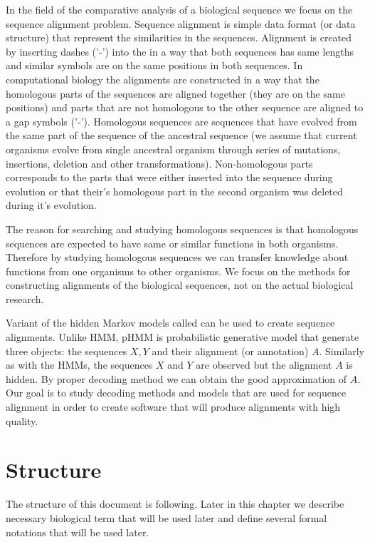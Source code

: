 In the field of the comparative analysis of a biological sequence we focus on the
sequence alignment problem. Sequence alignment is simple data format (or data
structure) that represent the similarities in the sequences. Alignment is
created by inserting dashes ('-') into the in a way that both sequences has same
lengths and similar symbols are on the same positions in both sequences. In
computational biology the alignments are constructed in a way that the
homologous parts of the sequences are aligned together (they are on the same
positions) and parts that are not homologous to the other sequence are aligned
to a gap symbols ('-'). Homologous sequences are sequences that have evolved
from the same part of the sequence of the ancestral sequence (we assume that
current organisms evolve from single ancestral organism through series of 
mutations, insertions, deletion and other transformations).
Non-homologous parts corresponds to the parts that were either inserted into 
the sequence during evolution or that their's homologous part in the second
organism was deleted during it's evolution.

The reason for searching and studying homologous sequences is that homologous
sequences are expected to have same or similar functions in both organisms.
Therefore by studying homologous sequences we can transfer knowledge about
functions from one organisms to other organisms. We focus on the methods for
constructing alignments of the biological sequences, not on the actual
biological research.

Variant of the hidden Markov models called  can be used to create sequence alignments. Unlike HMM, pHMM is
probabilistic generative model that generate three objects: the sequences $X,Y$
and their alignment (or annotation) $A$. Similarly as with the HMMs, the
sequences $X$ and $Y$ are observed but the alignment $A$ is hidden. By proper
decoding method we can obtain the good approximation of $A$. Our goal is to
study decoding methods and models that are used for sequence alignment in order
to create software that will produce alignments with high quality.

\section{Structure}

The structure of this document is following. Later in this chapter we describe
necessary biological term that will be used later and define several formal
notations that will be used later.

